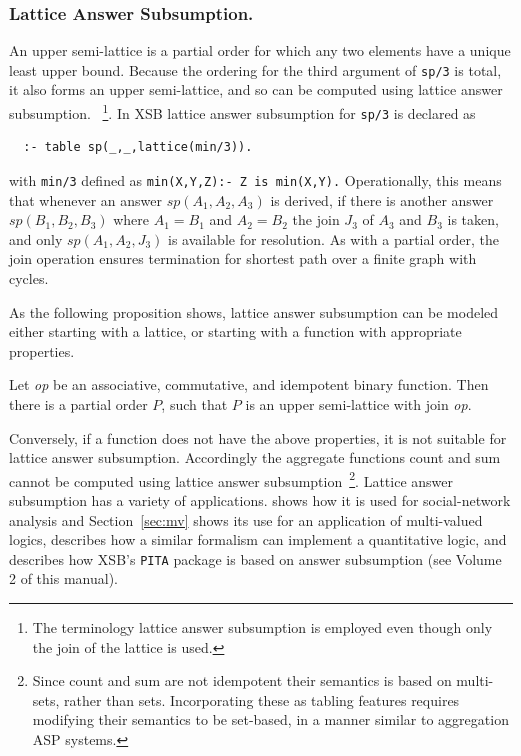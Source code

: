 \subsubsection{Lattice Answer Subsumption.}
An upper semi-lattice is a partial order for which any two elements
have a unique least upper bound.  Because the ordering for the third
argument of {\tt sp/3} is total, it also forms an upper semi-lattice,
and so can be computed using lattice answer subsumption.
~\footnote{The terminology lattice answer subsumption is employed even
  though only the join of the lattice is used.}.  In XSB lattice
answer subsumption for {\tt sp/3} is declared as
%
{\small
\begin{verbatim}
  :- table sp(_,_,lattice(min/3)).
\end{verbatim}
}
%
\noindent
with {\tt min/3} defined as {\tt min(X,Y,Z):- Z is min(X,Y).} 
Operationally, this means that whenever an answer
$sp(A_1,A_2,A_3)$ is derived, if there is another answer
$sp(B_1,B_2,B_3)$ where $A_1 = B_1$ and $A_2 = B_2$ the join $J_3$ of
$A_3$ and $B_3$ is taken, and only $sp(A_1,A_2,J_3)$ is available for
resolution.  As with a partial order, the join operation
ensures termination for shortest path over a finite graph with cycles.

As the following proposition shows, lattice answer subsumption can be
modeled either starting with a lattice, or starting with a function
with appropriate properties.
\begin{proposition}
Let {\em op} be an associative, commutative, and idempotent binary
function.  Then there is a partial order $P$, such that $P$ is an
upper semi-lattice with join {\em op}.
\end{proposition}
% 
Conversely, if a function does not have the above properties, it is
not suitable for lattice answer subsumption.  Accordingly the
aggregate functions count and sum cannot be computed using lattice
answer subsumption~\footnote{Since count and sum are not idempotent
  their semantics is based on multi-sets, rather than sets.
  Incorporating these as tabling features requires modifying their
  semantics to be set-based, in a manner similar to aggregation ASP
  systems.}.
%
Lattice answer subsumption has a variety of applications.
\cite{SwiW10a} shows how it is used for social-network analysis and
Section~\ref{sec:mv} shows its use for an application of multi-valued
logics, \cite{Swif99a} describes how a similar formalism can implement
a quantitative logic, and \cite{RigS11a,RigS13} describes how XSB's
{\tt PITA} package is based on answer subsumption (see Volume 2 of
this manual).

